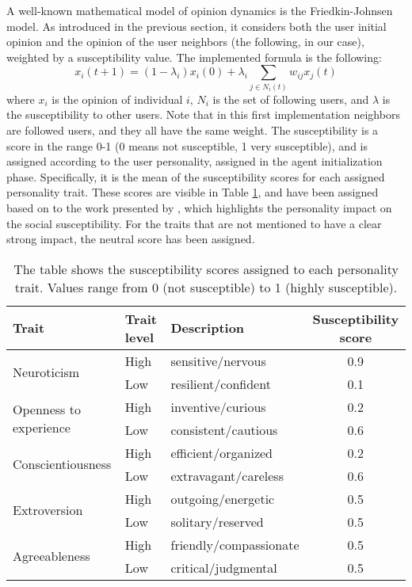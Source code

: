 A well-known mathematical model of opinion dynamics is the Friedkin-Johnsen model. As introduced in the previous section, it considers both the user initial opinion and the opinion of the user neighbors (the following, in our case), weighted by a susceptibility value.
The implemented formula is the following:
\[
x_i(t + 1) = (1 - \lambda_i) x_i(0) + \lambda_i  \sum_{j \in N_i(t)} w_{ij} x_j (t)
\]
where $x_i$ is the opinion of individual $i$, $N_i$ is the set of following users, and $\lambda$ is the susceptibility to other users. 
Note that in this first implementation neighbors are followed users, and they all have the same weight.
The susceptibility is a score in the range 0-1 (0 means not susceptible, 1 very susceptible), and is assigned according to the user personality, assigned in the agent initialization phase. Specifically, it is the mean of the susceptibility scores for each assigned personality trait. These scores are visible in Table \ref{tab:susceptibility}, and have been assigned based on to the work presented by \citet{oyibo2019personality}, which highlights the personality impact on the social susceptibility. For the traits that are not mentioned to have a clear strong impact, the neutral score has been assigned.

\begin{table}[h]
\centering
\begin{tabular}{|l|l|l|c|}
\hline
\textbf{Trait} & \textbf{Trait level} & \textbf{Description} & \textbf{Susceptibility score} \\
\hline
\multirow{2}{*}{Neuroticism}       
  & High & sensitive/nervous         & 0.9 \\
  & Low & resilient/confident        & 0.1 \\
\hline
\multirow{2}{*}{Openness to experience}          
  & High & inventive/curious         & 0.2 \\
  & Low & consistent/cautious        & 0.6 \\
\hline
\multirow{2}{*}{Conscientiousness} 
  & High & efficient/organized       & 0.2 \\
  & Low & extravagant/careless       & 0.6 \\
\hline
\multirow{2}{*}{Extroversion}      
  & High & outgoing/energetic        & 0.5 \\
  & Low & solitary/reserved          & 0.5 \\
\hline
\multirow{2}{*}{Agreeableness}     
  & High & friendly/compassionate    & 0.5 \\
  & Low & critical/judgmental        & 0.5 \\
\hline
\end{tabular}
\caption{The table shows the susceptibility scores assigned to each personality trait. Values range from 0 (not susceptible) to 1 (highly susceptible).}
\label{tab:susceptibility}
\end{table}

